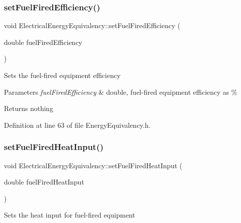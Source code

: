 \subsubsection{\texorpdfstring{set\+Fuel\+Fired\+Efficiency()}{setFuelFiredEfficiency()}\hspace{0.1cm}{\footnotesize\ttfamily [3/3]}}
{\footnotesize\ttfamily void Electrical\+Energy\+Equivalency\+::set\+Fuel\+Fired\+Efficiency (\begin{DoxyParamCaption}\item[{double}]{fuel\+Fired\+Efficiency }\end{DoxyParamCaption})\hspace{0.3cm}{\ttfamily [inline]}}

Sets the fuel-\/fired equipment efficiency


\begin{DoxyParams}{Parameters}
{\em fuel\+Fired\+Efficiency} & double, fuel-\/fired equipment efficiency as \%\\
\hline
\end{DoxyParams}
\begin{DoxyReturn}{Returns}
nothing 
\end{DoxyReturn}


Definition at line 63 of file Energy\+Equivalency.\+h.

\mbox{\label{class_electrical_energy_equivalency_a9daf2b93c52c31cb999e5a9a18f1dd54}} 
\subsubsection{\texorpdfstring{set\+Fuel\+Fired\+Heat\+Input()}{setFuelFiredHeatInput()}\hspace{0.1cm}{\footnotesize\ttfamily [1/3]}}
{\footnotesize\ttfamily void Electrical\+Energy\+Equivalency\+::set\+Fuel\+Fired\+Heat\+Input (\begin{DoxyParamCaption}\item[{double}]{fuel\+Fired\+Heat\+Input }\end{DoxyParamCaption})\hspace{0.3cm}{\ttfamily [inline]}}

Sets the heat input for fuel-\/fired equipment



